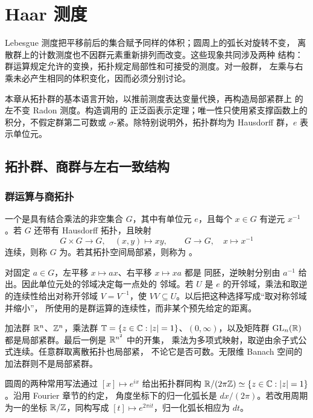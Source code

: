 \chapter{Haar 测度}
\label{chap:haar-measure}

Lebesgue 测度把平移前后的集合赋予同样的体积；圆周上的弧长对旋转不变，
离散群上的计数测度也不因群元素重新排列而改变。这些现象共同涉及两种
结构：群运算规定允许的变换，拓扑规定局部性和可接受的测度。对一般群，
左乘与右乘未必产生相同的体积变化，因而必须分别讨论。

本章从拓扑群的基本语言开始，以推前测度表达变量代换，再构造局部紧群上
的左不变 Radon 测度。构造调用的
正泛函表示定理；唯一性只使用紧支撑函数上的积分，不假定群第二可数或
$\sigma$-紧。除特别说明外，拓扑群均为 Hausdorff 群，$e$ 表示单位元。

\section{拓扑群、商群与左右一致结构}
\label{sec:topological-groups-uniformities}

\subsection{群运算与商拓扑}

\begin{definition}
一个是具有结合乘法的非空集合 $G$，其中有单位元 $e$，且每个
$x\in G$ 有逆元 $x^{-1}$。若 $G$ 还带有 Hausdorff 拓扑，且映射
\[
 G\times G\longrightarrow G,\quad(x,y)\longmapsto xy,
 \qquad G\longrightarrow G,\quad x\longmapsto x^{-1}
\]
连续，则称 $G$ 为。若其拓扑空间局部紧，则称为
。
\end{definition}

对固定 $a\in G$，左平移 $x\mapsto ax$、右平移 $x\mapsto xa$ 都是
同胚，逆映射分别由 $a^{-1}$ 给出。因此单位元处的邻域决定每一点处的
邻域。若 $U$ 是 $e$ 的开邻域，乘法和取逆的连续性给出对称开邻域
$V=V^{-1}$，使 $VV\subseteq U$。以后把这种选择写成“取对称邻域并缩小”，
所使用的是群运算的连续性，而非某个预先给定的距离。

加法群 $\mathbb{R}^n$、$\mathbb{Z}^n$，乘法群
$\mathbb T=\{z\in\mathbb{C}:|z|=1\}$、$(0,\infty)$，以及矩阵群
$\mathrm{GL}_n(\mathbb{R})$ 都是局部紧群。最后一例是 $\mathbb{R}^{n^2}$ 中的开集，
乘法为多项式映射，取逆由余子式公式连续。任意群取离散拓扑也局部紧，
不论它是否可数。无限维 Banach 空间的加法群则不是局部紧群。

圆周的两种常用写法通过 $[x]\mapsto e^{ix}$ 给出拓扑群同构
$\mathbb{R}/(2\pi\mathbb{Z})\simeq\{z\in\mathbb{C}:|z|=1\}$。沿用 Fourier 章节的约定，
角度坐标下的归一化弧长是 $dx/(2\pi)$。若改用周期为一的坐标
$\mathbb{R}/\mathbb{Z}$，同构写成 $[t]\mapsto e^{2\pi it}$，归一化弧长相应为 $dt$。

